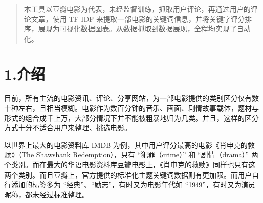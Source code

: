 \documentclass[10pt]{article}
\begin{document}
\mdxtitleblockstart{}
\mdxauthorstart{}


\mdxauthorend\mdtitleauthorrunning{}{}\mdxtitleblockend%

\begin{abstract}%

\noindent{}本工具以豆瓣电影为代表，未经监督训练，抓取用户评论，再通过用户的评论文章，使用 TF-IDF 来提取一部电影的关键词信息，并将关键字评分排序，展现为可视化数据图表。从数据抓取到数据展现，全程均实现了自动化。%
\end{abstract}%

\section{1.\hspace*{0.5em}介绍}\label{sec-intro}%

\noindent{}目前，所有主流的电影资讯、评论、分享网站，为一部电影提供的类别区分仅有数十种左右，且相当模糊。电影作为数百分钟的音乐、画面、剧情故事载体，题材与形式的组合成千上万，大部分情况下并不能被粗暴地归为几类。并且，这样的区分方式十分不适合用户来整理、挑选电影。%

以世界上最大的电影资料库 IMDB 为例，其中用户评分最高的电影《肖申克的救赎》（The Shawshank Redemption），只有 “犯罪（crime）” 和 “剧情（drama）” 两个类别。而在最大的华语电影资料库豆瓣电影上，《肖申克的救赎》同样也只有这两个类别。而且豆瓣上，官方提供的标准化主题关键词数据则有更加限。而用户自行添加的标签多为 “经典”、“励志”，有时又为电影年代如 “1949”，有时又为演员昵称，都未经过标准整理。%
\end{document}
